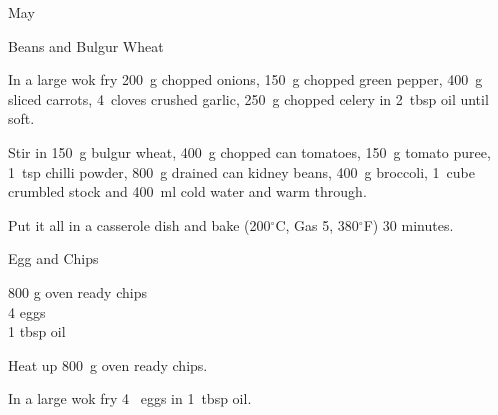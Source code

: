 \begin{menu}{May}
\begin{recipe}{2}{Beans and Bulgur Wheat}
    \begin{instructions}
    \item 
        In a large wok fry
        200~g chopped onions,
        150~g chopped green pepper,
        400~g sliced carrots,
        4~cloves crushed garlic,
        250~g chopped celery
        in
        2~tbsp  oil
        until soft.
      \item 
        Stir in
        150~g  bulgur wheat,
        400~g chopped can tomatoes,
        150~g  tomato puree,
        1~tsp  chilli powder,
        800~g drained can kidney beans,
        400~g  broccoli,
        1~cube crumbled stock
        and
        400~ml  cold water
        and warm through.
      \item 
        Put it all in a casserole dish
        and bake (200$^{\circ}$C, Gas 5, 380$^{\circ}$F) 30 minutes.
      
    \end{instructions}
    \end{recipe}%
  
    \begin{recipe}{1}{Egg and Chips}%
		\begin{ingredients}
		800 g oven ready chips  \\
	4  eggs  \\
	1 tbsp oil  \\
	
		\end{ingredients}
	
	
    \begin{instructions}
    \item 
        Heat up
        800~g  oven ready chips.
      \item 
        In a large wok fry
        4~  eggs
        in
        1~tbsp  oil.
      
    \end{instructions}
    \end{recipe}%
  
    \clearpage
    \end{menu}
	
